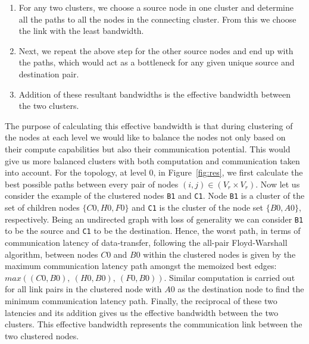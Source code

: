 \begin{itemize}
\begin{enumerate}
  \item For any two clusters, we choose a source node in one cluster and
    determine all the paths to all the nodes in the connecting
    cluster. From this we choose the link with the least bandwidth.

  \item Next, we repeat the above step for the other source nodes and
    end up with the paths, which would act as a bottleneck for any given
    unique source and destination pair.

  \item Addition of these resultant bandwidths is the effective
    bandwidth between the two clusters.

  \end{enumerate}
\end{itemize}

The purpose of calculating this effective bandwidth is that during clustering
of the nodes at each level we would like to balance the nodes not only based on
their compute capabilities but also their communication potential. This would
give us more balanced clusters with both computation and communication taken
into account. For the topology, at level 0, in Figure~\ref{fig:res}, we first
calculate the best possible paths between every pair of nodes
\mbox{$(i,j) \in (V_r \times V_r)$}. Now let us consider the example
of the clustered nodes \texttt{B1} and \texttt{C1}. Node \texttt{B1}
is a cluster of the set of children nodes $\{C0, H0, F0\}$ and
\texttt{C1} is the cluster of the node set $\{B0, A0\}$,
respectively. Being an undirected graph with loss of generality we can
consider \texttt{B1} to be the source and \texttt{C1} to be the
destination. Hence, the worst path, in terms of communication latency of
data-transfer, following the all-pair Floyd-Warshall algorithm,
between nodes $C0$ and $B0$ within the clustered nodes is given by the
maximum communication latency path amongst the memoized best edges:
$max((C0,B0),\
(H0,B0),\ (F0,B0))$. Similar computation is carried out for all link
pairs in the clustered node with $A0$ as the destination node to find
the minimum communication latency path. Finally, the reciprocal of these two
latencies and its addition gives us the effective bandwidth between
the two clusters. This effective bandwidth represents the
communication link between the two clustered nodes.


